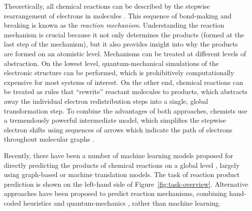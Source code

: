 


Theoretically, all chemical reactions can be described by the stepwise rearrangement of electrons in molecules \cite{herges1994organizing}. 
This sequence of bond-making and breaking is known as the \emph{reaction mechanism}. 
Understanding the reaction mechanism is crucial because it not only determines the products (formed at the last step of the mechanism), 
but it also provides insight into why the products are formed on an atomistic level. 
%
Mechanisms can be treated at different levels of abstraction. 
On the lowest level, quantum-mechanical simulations of the electronic structure can be performed, which is prohibitively computationally expensive for most systems of interest. 
On the other end, chemical reactions can be treated as rules that ``rewrite'' reactant molecules to products, which abstracts away the individual electron redistribution steps into a single, global transformation step. 
To combine the advantages of both approaches, chemists use a tremendously powerful intermediate model, which simplifies the stepwise electron shifts using sequences of arrows which indicate the path of electrons throughout molecular graphs \cite{herges1994organizing}. 

Recently, there have been a number of machine learning models proposed for directly predicting the products of chemical reactions on a global level \cite{coley2017prediction,jin2017predicting,schwaller2017found,neural-symbolic,segler2018planning,wei2016neural}, largely using graph-based or machine translation models. 
The task of reaction product prediction is shown on the left-hand side of Figure~\ref{fig:task-overview}. 
Alternative approaches have been proposed to predict reaction mechanisms, combining hand-coded heuristics and quantum-mechanics \cite{bergeler2015heuristics,kim2018efficient,rappoport2014complex,simm2017context,zimmerman2013automated}, rather than machine learning.



